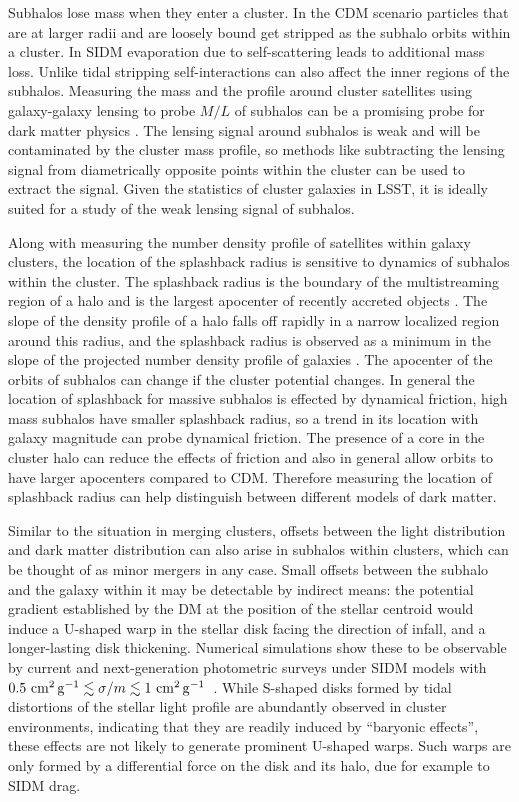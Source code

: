 Subhalos lose mass when they enter a cluster. In the CDM scenario particles that are at larger radii and are loosely bound get stripped as the subhalo orbits within a cluster. In SIDM evaporation due to self-scattering leads to additional mass loss. Unlike tidal stripping self-interactions can also affect the inner regions of the subhalos. Measuring the mass and the profile around cluster satellites using galaxy-galaxy lensing to probe $M/L$ of subhalos can be a promising probe for dark matter physics \cite{Natarajan:2017sbo}. The lensing signal around subhalos is weak and will be contaminated by the cluster mass profile, so methods like subtracting the lensing signal from diametrically opposite points within the cluster can be used to  extract the signal. Given the statistics of cluster galaxies in LSST, it is ideally suited for a study of the weak lensing signal of subhalos. 


Along with measuring the number density profile of satellites within galaxy clusters, the location of the splashback radius is sensitive to dynamics of subhalos within the cluster. The splashback radius is the boundary of the multistreaming region of a halo and is the largest apocenter of recently accreted objects \cite{Diemer:2014xya,Adhikari:2014lna}. The slope of the density profile of a halo falls off rapidly in a narrow localized region around this radius, and the splashback radius is observed as a minimum in the slope of the projected number density profile of galaxies \cite{More:2016vgs,Baxter:2017csy,Chang:2017hjt}.
The apocenter of the orbits of subhalos can change if the cluster potential changes. In general the location of splashback for massive subhalos is effected by dynamical friction, high mass subhalos have smaller splashback radius, so a trend in its location with galaxy magnitude can probe dynamical friction. The presence of a core in the cluster halo can reduce the effects of friction and also in general allow orbits to have larger apocenters compared to CDM. Therefore measuring the location of splashback radius can help distinguish between different models of dark matter.

Similar to the situation in merging clusters, offsets between the light distribution and dark matter distribution can also arise in subhalos within clusters, which can be thought of as minor mergers in any case. Small offsets between the subhalo and the galaxy within it may be detectable by indirect means: the potential gradient established by the DM at the position of the stellar centroid would induce a U-shaped warp in the stellar disk facing the direction of infall, and a longer-lasting disk thickening. Numerical simulations show these to be observable by current and next-generation photometric surveys under SIDM models with $0.5 \mathrm{\,\mathrm{\,cm}^2\mathrm{\,g}^{-1}} \lesssim \sigma/m \lesssim 1 \mathrm{\,\mathrm{\,cm}^2\mathrm{\,g}^{-1}}$~\citep{Secco}. While S-shaped disks formed by tidal distortions of the stellar light profile are abundantly observed in cluster environments, indicating that they are readily induced by ``baryonic effects'', these effects are not likely to generate prominent U-shaped warps. Such warps are only formed by a differential force on the disk and its halo, due for example to SIDM drag.



